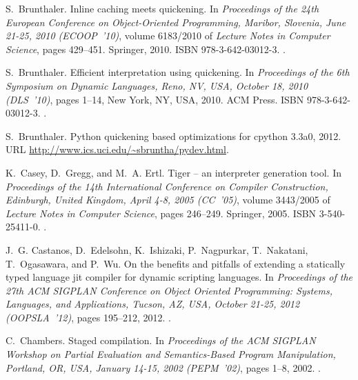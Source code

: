 \documentclass[preprint,10pt]{popl14conf}
\begin{document}
\begin{thebibliography}{46}
S.~Brunthaler.
\newblock Inline caching meets quickening.
\newblock In \emph{Proceedings of the 24th European Conference on
  Object-Oriented Programming, Maribor, Slovenia, June 21-25, 2010
  (ECOOP~'10)}, volume 6183/2010 of \emph{Lecture Notes in Computer Science},
  pages 429--451. Springer, 2010{}.
\newblock ISBN 978-3-642-03012-3.
\newblock {}.

S.~Brunthaler.
\newblock Efficient interpretation using quickening.
\newblock In \emph{Proceedings of the 6th {Symposium on Dynamic Languages},
  Reno, NV, USA, October 18, 2010 (DLS~'10)}, pages 1--14, New York, NY, USA,
  2010{}. ACM Press.
\newblock ISBN 978-3-642-03012-3.
\newblock {}.

S.~Brunthaler.
\newblock Python quickening based optimizations for cpython 3.3a0, 2012.
\newblock URL \url{http://www.ics.uci.edu/~sbruntha/pydev.html}.

K.~Casey, D.~Gregg, and M.~A. Ertl.
\newblock Tiger -- an interpreter generation tool.
\newblock In \emph{Proceedings of the 14th {International Conference on
  Compiler Construction}, Edinburgh, United Kingdom, April 4-8, 2005 (CC~'05)},
  volume 3443/2005 of \emph{Lecture Notes in Computer Science}, pages 246--249.
  Springer, 2005.
\newblock ISBN 3-540-25411-0.
\newblock {}.

J.~G. Castanos, D.~Edelsohn, K.~Ishizaki, P.~Nagpurkar, T.~Nakatani,
  T.~Ogasawara, and P.~Wu.
\newblock On the benefits and pitfalls of extending a statically typed language
  jit compiler for dynamic scripting languages.
\newblock In \emph{Proceedings of the 27th {ACM} {SIGPLAN} {C}onference on
  {O}bject {O}riented {P}rogramming: {S}ystems, {L}anguages, and
  {A}pplications, Tucson, AZ, USA, October 21-25, 2012 (OOPSLA~'12)}, pages
  195--212, 2012.
\newblock {}.

C.~Chambers.
\newblock Staged compilation.
\newblock In \emph{Proceedings of the {ACM SIGPLAN Workshop on Partial
  Evaluation and Semantics-Based Program Manipulation}, Portland, OR, USA,
  January 14-15, 2002 (PEPM~'02)}, pages 1--8, 2002.
\newblock {}.


\end{thebibliography}
\end{document}
